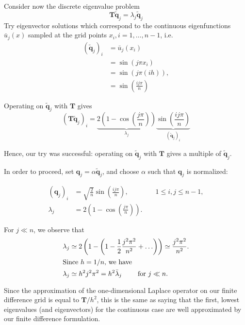 Consider now the discrete eigenvalue problem
\begin{equation*}
  \bm T \tilde{\bm q}_j =
  \lambda_j \tilde{\bm q}_j
\end{equation*}
Try eigenvector solutions which correspond to the continuous eigenfunctions
$\bar{u}_j(x)$ sampled at the grid points $x_i, i=1,\ldots,n-1$, i.e.
\begin{equation*}
  \begin{split}
    (\tilde{\bm q}_j)_i &= \bar{u}_j (x_i) \\
    &= \sin(j \pi x_i) \\
    &= \sin(j \pi (i h)), \\
    &= \sin \left(\frac{i j \pi}{n} \right)
  \end{split}
\end{equation*}

Operating on $\tilde{\bm q}_j$ with $\bm T$ gives
\begin{equation*}
  (\bm T \tilde{\bm q}_j)_i =
  \underbrace{2\left( 1 - \cos\left( \frac{j\pi}{n} \right) \right)}_{\lambda_j}
  \underbrace{\sin\left( \frac{i j \pi}{n} \right)}_{(\tilde{\bm q}_j)_i}
\end{equation*}

Hence, our try was successful: operating on $\tilde{\bm q}_j$ with $\bm T$ gives
a multiple of $\tilde{\bm q}_j$.

In order to proceed, set $\bm q_j = \alpha \tilde{\bm q}_j$, and choose $\alpha$
such that $\bm q_j$ is normalized:

\begin{align*}
  (\bm q_j)_i &= \sqrt{\frac{2}{n}} \sin \left( \frac{ij \pi}{n} \right),
                \qquad \qquad 1 \leq i,j \leq n-1, \\
  \lambda_j &= 2 \left( 1 - \cos \left( \frac{j \pi}{n} \right) \right).
\end{align*}

For ${j \ll n}$, we observe that
\begin{align*}
  \lambda_j
  &\simeq 2 \left( 1 - \left( 1 -\frac{1}{2} \frac{j^2 \pi^2}{n^2} + \ldots \right) \right)
    \simeq \frac{j^2 \pi^2}{n^2}. \\
  \intertext{Since $h=1/n$, we have}
  \lambda_j &\simeq h^2j^2 \pi^2 = h^2 \bar{\lambda}_j \qquad \text{ for } j \ll n.
\end{align*}

Since the approximation of the one-dimensional Laplace operator on our finite
difference grid is equal to $\bm T / h^2$, this is the same as saying that the
first, lowest eigenvalues (and eigenvectors) for the continuous case are well
approximated by our finite difference formulation.

